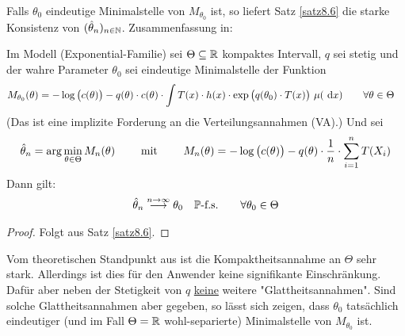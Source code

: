 
Falls $\theta_0$ eindeutige Minimalstelle von $M_{\theta_0}$ ist, so liefert Satz \ref{satz8.6} die starke Konsistenz von $(\hat{\theta}_n)_{n\in\N}$.
Zusammenfassung in:

\begin{satz}\label{satz8.7}
	 Im Modell (Exponential-Familie) sei $\Theta\subseteq\R$ kompaktes Intervall,
	 $q$ sei stetig und der wahre Parameter $\theta_0$ sei eindeutige Minimalstelle der Funktion
	 \begin{align*}
	 	M_{\theta_0}(\theta)
	 	&=-\log\big(c(\theta)\big)-q(\theta)\cdot c(\theta)\cdot\int\limits T(x)\cdot h(x)\cdot\exp\big(q(\theta_0)\cdot T(x)\big)~\mu(\d x)
	 	\qquad\forall\theta\in\Theta
	 \end{align*}
	 (Das ist eine implizite Forderung an die Verteilungsannahmen (VA).)
	 Und sei 
	 \begin{align*}
	 	\hat{\theta}_n=\arg\min\limits_{\theta\in\Theta} M_n(\theta)
	 	\qquad\mit\qquad
	 	M_n(\theta)=-\log\big(c(\theta)\big)-q(\theta)\cdot\frac{1}{n}\cdot\sum\limits_{i=1}^n T(X_i)
	 \end{align*}
	 Dann gilt:
	 \begin{align*}
	 	\hat{\theta}_n\overset{n\to\infty}{\longrightarrow}
	 	\theta_0\quad\P\text{-f.s.}\qquad\forall\theta_0\in\Theta
	 \end{align*}
\end{satz}

\begin{proof}
	Folgt aus Satz \ref{satz8.6}.
\end{proof}


Vom theoretischen Standpunkt aus ist die Kompaktheitsannahme an $\Theta$ sehr stark.
Allerdings ist dies für den Anwender keine signifikante Einschränkung.
Dafür aber neben der Stetigkeit von $q$ \underline{keine} weitere "Glattheitsannahmen".
Sind solche Glattheitsannahmen aber gegeben, so lässt sich zeigen, dass $\theta_0$ tatsächlich eindeutiger (und im Fall $\Theta=\R$ wohl-separierte) Minimalstelle von $M_{\theta_0}$ ist. 


